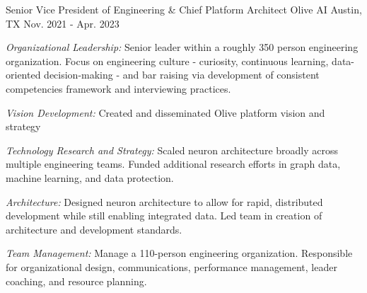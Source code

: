 \begin{cventries}


\cventry
{Senior Vice President of Engineering \& Chief Platform Architect}
{Olive AI}
{Austin, TX}
{Nov. 2021 - Apr. 2023}
{
  \begin{cvitems}
    \item{\emph{Organizational Leadership:} Senior leader within a roughly 350 person engineering organization. Focus on engineering culture - curiosity, continuous learning, data-oriented decision-making - and bar raising via development of consistent competencies framework and interviewing practices.}
    \item{\emph{Vision Development:} Created and disseminated Olive platform vision and strategy}
    \item{\emph{Technology Research and Strategy:} Scaled neuron architecture broadly across multiple engineering teams. Funded additional research efforts in graph data, machine learning, and data protection. }
    \item{\emph{Architecture:} Designed neuron architecture to allow for rapid, distributed development while still enabling integrated data. Led team in creation of architecture and development standards. }
    \item{\emph{Team Management:} Manage a 110-person engineering organization. Responsible for organizational design, communications, performance management, leader coaching, and resource planning.}
  \end{cvitems}
}



\end{cventries}
